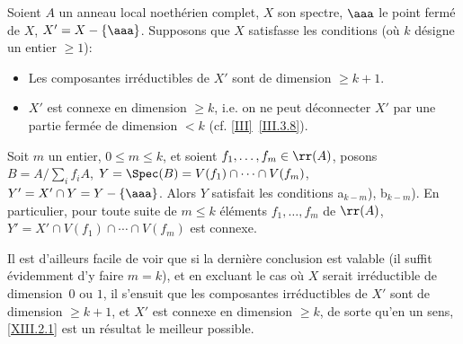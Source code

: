 \begin{theoreme} \label{XIII.2.1}
Soient $A$ un anneau local noeth\'erien complet, $X$ son spectre, $\aaa$ le point ferm\'e de $X$, $X'=X-\{ \aaa\}$. Supposons que $X$ satisfasse les conditions (o\`u $k$ d\'esigne un entier $\ge 1$):
\begin{itemize}
\item[a$_k$)] Les composantes irr\'eductibles de $X'$ sont de dimension $\ge k+1$.

\item[b$_k$)] $X'$ est connexe en dimension $\ge k$, i.e. on ne peut d\'econnecter $X'$ par une partie ferm\'ee de dimension $<k$ (cf. \ref{III}~\ref{III.3.8}).
\end{itemize}

Soit $m$ un entier, $0\le m\le k$, et soient $f_1, \dotsc, f_m\in \rr(A)$, posons $B=A/\sum_i f_iA$, $Y=\Spec(B)=V(f_1)\cap\dotsb\cap V(f_m)$, $Y'=X'\cap Y=Y-\{\aaa\}$. Alors $Y$ satisfait les conditions a$_{k-m}$), b$_{k-m}$). En particulier, pour toute suite de $m\le k$ \'el\'ements $f_1, \dotsc, f_m$ de $\rr(A)$, $Y'=X'\cap V(f_1)\cap\dotsb\cap V(f_m)$ est connexe.
\end{theoreme}

Il est d'ailleurs facile de voir que si la derni\`ere conclusion est valable (il suffit \'evidemment d'y faire $m=k$), et en excluant le cas o\`u $X$ serait irr\'eductible de dimension~$0$ ou $1$, il s'ensuit que les composantes irr\'eductibles de $X'$ sont de dimension $\ge k+1$, et $X'$ est connexe en dimension $\geq k$, de sorte qu'en un sens, \ref{XIII.2.1} est un r\'esultat \og le meilleur possible\fg.

\bigskip

